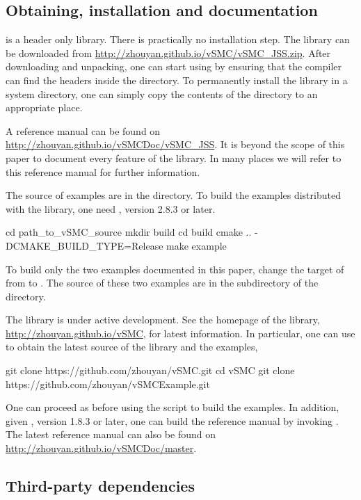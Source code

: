 \documentclass[11pt, fontset=Minion, showoverfull,
bib, biblatexstyle=numeric, mintcode, minted=cache]{marticle}
\begin{document}
\subsection{Obtaining, installation and documentation}

\vsmc is a header only library. There is practically no installation step. The
library can be downloaded from
\url{http://zhouyan.github.io/vSMC/vSMC_JSS.zip}. After downloading and
unpacking, one can start using \vsmc by ensuring that the compiler can find
the headers inside the  directory. To permanently install
the library in a system directory, one can simply copy the contents of the
 directory to an appropriate place.

A reference manual can be found on
\url{http://zhouyan.github.io/vSMCDoc/vSMC_JSS}. It is beyond the scope of
this paper to document every feature of the library. In many places we will
refer to this reference manual for further information.

The source of examples are in the  directory. To build
the examples distributed with the library, one need \ccmake, version 2.8.3 or
later.
\begin{shcode}
cd path_to_vSMC_source
mkdir build
cd build
cmake .. -DCMAKE_BUILD_TYPE=Release
make example
\end{shcode}
To build only the two examples documented in this paper, change the target of
 from  to . The source of
these two examples are in the  subdirectory of the
 directory.

The library is under active development. See the homepage of the library,
\url{http://zhouyan.github.io/vSMC}, for latest information. In particular,
one can use \cgit to obtain the latest source of the library and the examples,
\begin{shcode}
git clone https://github.com/zhouyan/vSMC.git
cd vSMC
git clone https://github.com/zhouyan/vSMCExample.git
\end{shcode}
One can proceed as before using the \cmake script to build the examples. In
addition, given \cdoxygen, version 1.8.3 or later, one can build the reference
manual by invoking . The latest reference manual can also
be found on \url{http://zhouyan.github.io/vSMCDoc/master}.

\subsection{Third-party dependencies}
\end{document}
